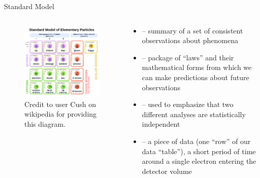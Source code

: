 \documentclass[aspectratio=169]{beamer}
\begin{document}
\begin{frame}{Standard Model}
  \begin{columns}
    \begin{column}{0.4\textwidth}
      \begin{figure}
        \includegraphics[width=\textwidth]{../figures/intro/Standard_Model_of_Elementary_Particles.svg.png}
        \caption{Credit to user Cush on wikipedia for providing this diagram.}
      \end{figure}
    \end{column}
    \begin{column}{0.6\textwidth}
      \begin{itemize}
        \item {} -- summary of a set of consistent observations about phenomena
        \item {} -- package of ``laws'' and their mathematical forms from which we can make predictions about future observations
        \item {} -- used to emphasize that two different analyses are statistically independent
        \item {} -- a piece of data (one ``row'' of our data ``table''), a short period of time around a single electron entering the detector volume
      \end{itemize}
    \end{column}
  \end{columns}
\end{frame}
\end{document}
